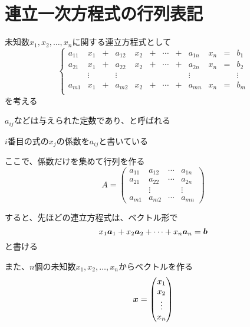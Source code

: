 \documentclass[../../../topic_linear-algebra]{subfiles}
\begin{document}
\sectionline
\section{連立一次方程式の行列表記}

未知数$x_1, x_2, \dots, x_n$に関する連立方程式として
\begin{equation*}
  \left\{
  \begin{alignedat}{12}
    a_{11} & x_1    & {}+{} & a_{12} & x_2 & {}+{} & \cdots & {}+{} & a_{1n} & x_n & {}={} & b_1    \\
    a_{21} & x_1    & {}+{} & a_{22} & x_2 & {}+{} & \cdots & {}+{} & a_{2n} & x_n & {}={} & b_2    \\
           & \vdots &       & \vdots &     &       &        &       & \vdots &     &       & \vdots \\
    a_{m1} & x_1    & {}+{} & a_{m2} & x_2 & {}+{} & \cdots & {}+{} & a_{mn} & x_n & {}={} & b_m    \\
  \end{alignedat}
  \right.
\end{equation*}
を考える

$a_{ij}$などは与えられた定数であり、と呼ばれる

$i$番目の式の$x_j$の係数を$a_{ij}$と書いている

\br

ここで、係数だけを集めて行列を作る
\begin{equation*}
  A = \begin{pmatrix}
    a_{11} & a_{12} & \cdots & a_{1n} \\
    a_{21} & a_{22} & \cdots & a_{2n} \\
           & \vdots &        & \vdots \\
    a_{m1} & a_{m2} & \cdots & a_{mn}
  \end{pmatrix}
\end{equation*}

すると、先ほどの連立方程式は、ベクトル形で
\begin{equation*}
  x_1 \vb*{a}_1 + x_2 \vb*{a}_2 + \cdots + x_n \vb*{a}_n = \vb*{b}
\end{equation*}
と書ける

\br

また、$n$個の未知数$x_1, x_2, \dots, x_n$からベクトルを作る
\begin{equation*}
  \vb*{x} = \begin{pmatrix}
    x_1    \\
    x_2    \\
    \vdots \\
    x_n
  \end{pmatrix}
\end{equation*}
\end{document}
